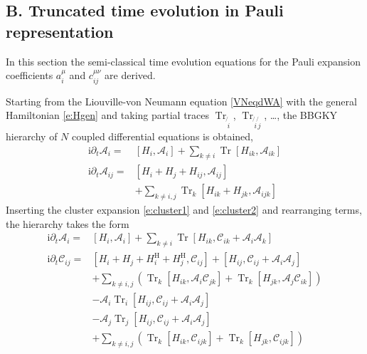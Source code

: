 \documentclass[aps,prl,showpacs,amsmath,amssymb,superscriptaddress,reprint,10pt]{revtex4-1}
\newcommand\ii{{\mathrm{i}}}
\newcommand{\Com}[2]{\left[{#1},{#2}\right]}
\DeclareMathOperator{\Tr}{{Tr}}
\begin{document}
\begin{bibunit}
\section{B. Truncated time evolution in Pauli representation}
\setcounter{section}{2}
\setcounter{equation}{0}
\setcounter{figure}{0}

In this section the semi-classical time evolution equations for the Pauli expansion coefficients $a_i^\mu$ and $c_{ij}^{\mu\nu}$ are derived.

Starting from the Liouville-von Neumann equation \eqref{VNeqdWA} with the general Hamiltonian \eqref{e:Hgen} and taking partial traces $\Tr_{\not{\,i}}$, $\Tr_{\not{\,i}\not{\,j}}$, \dots, the BBGKY hierarchy of $N$ coupled differential equations is obtained,
\begin{subequations}
\begin{align}
\ii\partial_t \mathscr{A}_i=&\Com{H_i}{\mathscr{A}_i}+\sum_{k\neq i}\Tr\Com{H_{ik}}{\mathscr{A}_{ik}}\label{e:1st_order_app1}\\
\ii\partial_t \mathscr{A}_{ij}=&\Com{H_i+H_j+H_{ij}}{\mathscr{A}_{ij}}\nonumber\\
&+\sum_{k\neq i,j}\Tr_k\Com{H_{ik}+H_{jk}}{\mathscr{A}_{ijk}}
\label{e:2nd_order_app1}
\end{align}
\end{subequations}
Inserting the cluster expansion \eqref{e:cluster1} and \eqref{e:cluster2} and rearranging terms, the hierarchy takes the form 
\begin{subequations}
\begin{align}
\ii\partial_t \mathscr{A}_i=&\Com{H_i}{\mathscr{A}_i}+\sum_{k\neq i}\Tr\Com{H_{ik}}{\mathscr{C}_{ik}+\mathscr{A}_i \mathscr{A}_k}\label{e:1st_order_app2}\\
\ii\partial_t \mathscr{C}_{ij}=&\Com{H_i+H_j+H_i^\text{H}+H_j^\text{H}}{\mathscr{C}_{ij}}+\Com{H_{ij}}{\mathscr{C}_{ij}+\mathscr{A}_i \mathscr{A}_j}\nonumber\\
&+\sum_{k\neq i,j}\left(\Tr_k\Com{H_{ik}}{\mathscr{A}_i \mathscr{C}_{jk}}+\Tr_k\Com{H_{jk}}{\mathscr{A}_j \mathscr{C}_{ik}}\right)\nonumber\\
&-\mathscr{A}_i\Tr_i\Com{H_{ij}}{\mathscr{C}_{ij}+\mathscr{A}_i \mathscr{A}_j}\nonumber\\
&-\mathscr{A}_j\Tr_j\Com{H_{ij}}{\mathscr{C}_{ij}+\mathscr{A}_i \mathscr{A}_j}\nonumber\\
&+\sum_{k\neq i,j}\left(\Tr_k\Com{H_{ik}}{\mathscr{C}_{ijk}}+\Tr_k\Com{H_{jk}}{\mathscr{C}_{ijk}}\right)
\label{e:2nd_order_app2}
\end{align}

\end{subequations}
\end{bibunit}
\end{document}
